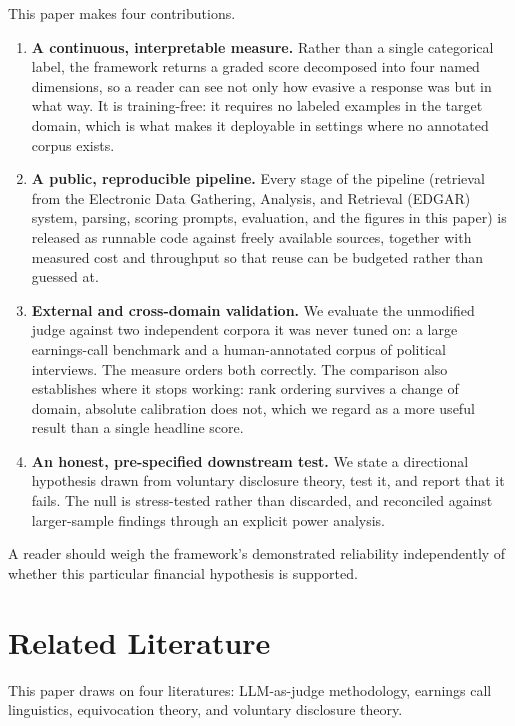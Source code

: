 \documentclass[conference]{IEEEtran}
\begin{document}
This paper makes four contributions.

\begin{enumerate}
\item \textbf{A continuous, interpretable measure.} Rather than a single categorical label, the framework returns a graded score decomposed into four named dimensions, so a reader can see not only how evasive a response was but in what way. It is training-free: it requires no labeled examples in the target domain, which is what makes it deployable in settings where no annotated corpus exists.
\item \textbf{A public, reproducible pipeline.} Every stage of the pipeline (retrieval from the Electronic Data Gathering, Analysis, and Retrieval (EDGAR) system, parsing, scoring prompts, evaluation, and the figures in this paper) is released as runnable code against freely available sources, together with measured cost and throughput so that reuse can be budgeted rather than guessed at.
\item \textbf{External and cross-domain validation.} We evaluate the unmodified judge against two independent corpora it was never tuned on: a large earnings-call benchmark and a human-annotated corpus of political interviews. The measure orders both correctly. The comparison also establishes where it stops working: rank ordering survives a change of domain, absolute calibration does not, which we regard as a more useful result than a single headline score.
\item \textbf{An honest, pre-specified downstream test.} We state a directional hypothesis drawn from voluntary disclosure theory, test it, and report that it fails. The null is stress-tested rather than discarded, and reconciled against larger-sample findings through an explicit power analysis.
\end{enumerate}

A reader should weigh the framework's demonstrated reliability independently of whether this particular financial hypothesis is supported.

\section{Related Literature}

This paper draws on four literatures: LLM-as-judge methodology, earnings call linguistics, equivocation theory, and voluntary disclosure theory.
\end{document}
